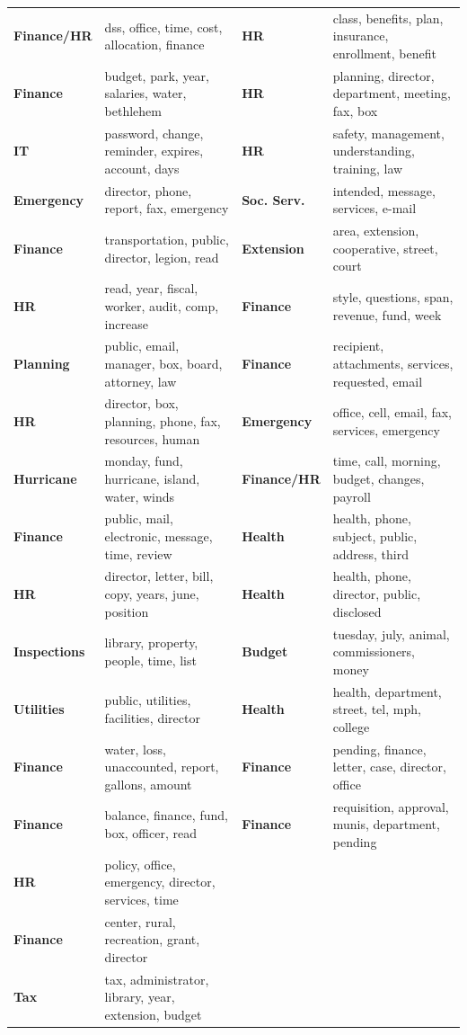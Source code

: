 \documentclass{pnastwo}
\begin{document}
\begin{article}
\begin{table}
\begin{tabular}{lm{}|lm{}}
\textbf{Finance/HR} & dss, office, time, cost, allocation, finance
 &
\textbf{HR} & class, benefits, plan, insurance, enrollment, benefit\\ 
\textbf{Finance} & budget, park, year, salaries, water, bethlehem
 &
\textbf{HR} & planning, director, department, meeting, fax, box\\ 
\textbf{IT} & password, change, reminder, expires, account, days
 &
\textbf{HR} & safety, management, understanding, training, law\\ 
\textbf{Emergency} & director, phone, report, fax, emergency
 &
\textbf{Soc. Serv.} & intended, message, services, e-mail\\ 
\textbf{Finance} & transportation, public, director, legion, read
 &
\textbf{Extension} & area, extension, cooperative, street, court\\ 
\textbf{HR} & read, year, fiscal, worker, audit, comp, increase
 &
\textbf{Finance} & style, questions, span, revenue, fund, week\\ 
\textbf{Planning} & public, email, manager, box, board, attorney, law
 &
\textbf{Finance} & recipient, attachments, services, requested, email\\ 
\textbf{HR} & director, box, planning, phone, fax, resources, human
 &
\textbf{Emergency} & office, cell, email, fax, services, emergency\\ 
\textbf{Hurricane } & monday, fund, hurricane, island, water, winds
 &
\textbf{Finance/HR} & time, call, morning, budget, changes, payroll\\ 
\textbf{Finance } & public, mail, electronic, message, time, review
 &
\textbf{Health } & health, phone, subject, public, address, third\\ 
\textbf{HR} & director, letter, bill, copy, years, june, position
 &
\textbf{Health} & health, phone, director, public, disclosed\\ 
\textbf{Inspections} & library, property, people, time, list
 &
\textbf{Budget} & tuesday, july, animal, commissioners, money\\ 
\textbf{Utilities} & public, utilities, facilities, director
 &
\textbf{Health} & health, department, street, tel, mph, college\\ 
\textbf{Finance} & water, loss, unaccounted, report, gallons, amount
 &
\textbf{Finance} & pending, finance, letter, case, director, office\\ 
\textbf{Finance} & balance, finance, fund, box, officer, read
 &
\textbf{Finance} & requisition, approval, munis, department, pending\\ 
\textbf{HR} & policy, office, emergency, director, services, time
 & &
\\ 
\textbf{Finance} & center, rural, recreation, grant, director
 & & 
\\ 
\textbf{Tax} & tax, administrator, library, year, extension, budget
 & &
\\


\end{tabular}
\end{table}
\end{article}
\end{document}
